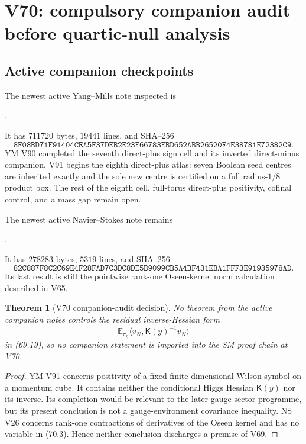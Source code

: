 \documentclass[11pt]{article}
\newtheorem{theorem}{Theorem}[section]
\theoremstyle{remark}
\begin{document}
\section{V70: compulsory companion audit before quartic-null analysis}
\label{sec:v17v70}

\subsection{Active companion checkpoints}

The newest active Yang--Mills note inspected is
\begin{center}\small
{}.
\end{center}
It has \(711720\) bytes, \(19441\) lines, and SHA--256
\[
 \texttt{8F08BD71F91404CEA5F37DEB2E23F66783EBD652ABB26520F4E38781E72382C9}.
                                                               \tag{70.1}
\]
YM V90 completed the seventh direct-plus sign cell and its inverted
direct-minus companion.  V91 begins the eighth direct-plus atlas: seven
Boolean seed centres are inherited exactly and the sole new centre is
certified on a full radius-\(1/8\) product box.  The rest of the eighth
cell, full-torus direct-plus positivity, cofinal control, and a mass gap
remain open.

The newest active Navier--Stokes note remains
\begin{center}\small
{}.
\end{center}
It has \(278283\) bytes, \(5319\) lines, and SHA--256
\[
 \texttt{82C887F8C2C69E4F28FAD7C3DC8DE5B9099CB5A4BF431EBA1FFF3E91935978AD}.
                                                               \tag{70.2}
\]
Its last result is still the pointwise rank-one Oseen-kernel norm
calculation described in V65.

\begin{theorem}[V70 companion-audit decision]
\label{thm:v17v70-decision}
No theorem from the active companion notes controls the residual
inverse-Hessian form
\[
 \mathbb E_{\pi_\eta}
 \langle v_N,\mathsf K(y)^{-1}v_N\rangle          \tag{70.3}
\]
in (69.19), so no companion statement is imported into the SM proof
chain at V70.
\end{theorem}

\begin{proof}
YM V91 concerns positivity of a fixed finite-dimensional Wilson symbol
on a momentum cube.  It contains neither the conditional Higgs Hessian
\(\mathsf K(y)\) nor its inverse.  Its completion would be relevant to
the later gauge-sector programme, but its present conclusion is not a
gauge-environment covariance inequality.  NS V26 concerns rank-one
contractions of derivatives of the Oseen kernel and has no variable in
(70.3).  Hence neither conclusion discharges a premise of V69.
\end{proof}
\end{document}
